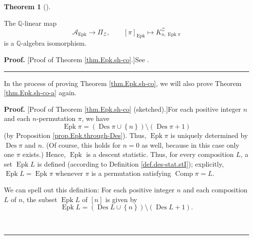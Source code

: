 \documentclass[numbers=enddot,12pt,final,onecolumn,notitlepage]{scrartcl}%
\theoremstyle{definition}
\newtheorem{theo}{Theorem}[section]
\newenvironment{theorem}[1][]
{\begin{theo}[#1]\begin{leftbar}}
{\end{leftbar}\end{theo}}
\newenvironment{proof}[1][Proof]{\noindent\textbf{#1.} }{\ \rule{0.5em}{0.5em}}
\newenvironment{verlong}{}{}
\newenvironment{vershort}{}{}
\newenvironment{noncompile}{}{}
\begin{document}
\begin{theorem}
\label{thm.Epk.sh-co}The $\mathbb{Q}$-linear map
\[
\mathcal{A}_{\operatorname{Epk}} \to \Pi_{\mathcal{Z}}, \qquad
\left[  \pi\right]  _{\operatorname{Epk}}\mapsto
K_{n,\operatorname{Epk} \pi}^{\mathcal{Z}}
\]
is a $\mathbb{Q}$-algebra isomorphism.
\end{theorem}

\begin{vershort}
\begin{proof}
[Proof of Theorem \ref{thm.Epk.sh-co}.]See \cite{verlong}.
\end{proof}
\end{vershort}

\begin{verlong}
In the process of proving Theorem \ref{thm.Epk.sh-co}, we will also prove
Theorem \ref{thm.Epk.sh-co-a} again.

\begin{proof}
[Proof of Theorem \ref{thm.Epk.sh-co} (sketched).]For each positive integer
$n$ and each $n$-permutation $\pi$, we have%
\[
\operatorname{Epk}\pi=\left(  \operatorname{Des}\pi\cup\left\{  n\right\}
\right)  \setminus\left(  \operatorname{Des}\pi+1\right)
\]
(by Proposition \ref{prop.Epk.through-Des}). Thus, $\operatorname{Epk}\pi$ is
uniquely determined by $\operatorname{Des}\pi$ and $n$. (Of course, this
holds for $n=0$ as well, because in this case only one $\pi$ exists.) Hence,
$\operatorname{Epk}$ is a descent statistic. Thus, for every composition $L$,
a set $\operatorname{Epk}L$ is defined (according to Definition
\ref{def.des-stat.stI}); explicitly,
$\operatorname{Epk}L=\operatorname{Epk}\pi$ whenever
$\pi$ is a permutation satisfying $\operatorname*{Comp}\pi=L$.

\begin{noncompile}
We can spell out this definition: For each positive integer $n$ and each
composition $L$ of $n$, the subset $\operatorname{Epk}L$ of $\left[
n\right]  $ is given by%
\[
\operatorname{Epk}L=\left(  \operatorname{Des}L\cup\left\{  n\right\}
\right)  \setminus\left(  \operatorname{Des}L+1\right)  .
\]

\end{noncompile}


\end{proof}
\end{verlong}
\end{document}
